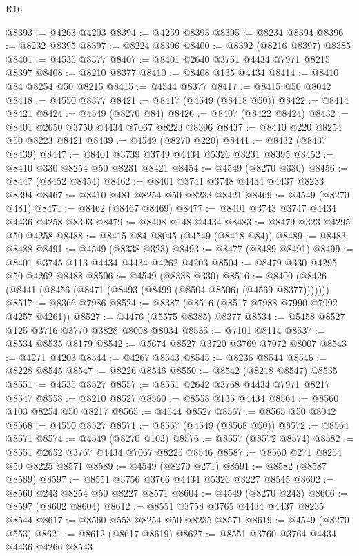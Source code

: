 \begin{lexlean}{R16}
\begin{coremodule}
@8393 := @4263 @4203
@8394 := @4259 @8393
@8395 := @8234 @8394
@8396 := @8232 @8395
@8397 := @8224 @8396
@8400 := @8392 (@8216 @8397) @8385
@8401 := @4535 @8377
@8407 := @8401 @2640 @3751 @4434 @7971 @8215 @8397
@8408 := @8210 @8377
@8410 := @8408 @135 @4434
@8414 := @8410 @84 @8254 @50 @8215
@8415 := @4544 @8377
@8417 := @8415 @50 @8042
@8418 := @4550 @8377
@8421 := @8417 (@4549 (@8418 @50))
@8422 := @8414 @8421
@8424 := @4549 (@8270 @84)
@8426 := @8407 (@8422 @8424)
@8432 := @8401 @2650 @3750 @4434 @7067 @8223 @8396
@8437 := @8410 @220 @8254 @50 @8223 @8421
@8439 := @4549 (@8270 @220)
@8441 := @8432 (@8437 @8439)
@8447 := @8401 @3739 @3749 @4434 @5326 @8231 @8395
@8452 := @8410 @330 @8254 @50 @8231 @8421
@8454 := @4549 (@8270 @330)
@8456 := @8447 (@8452 @8454)
@8462 := @8401 @3741 @3748 @4434 @4437 @8233 @8394
@8467 := @8410 @481 @8254 @50 @8233 @8421
@8469 := @4549 (@8270 @481)
@8471 := @8462 (@8467 @8469)
@8477 := @8401 @3743 @3747 @4434 @4436 @4258 @8393
@8479 := @8408 @148 @4434
@8483 := @8479 @323 @4295 @50 @4258
@8488 := @8415 @84 @8045 (@4549 (@8418 @84))
@8489 := @8483 @8488
@8491 := @4549 (@8338 @323)
@8493 := @8477 (@8489 @8491)
@8499 := @8401 @3745 @113 @4434 @4434 @4262 @4203
@8504 := @8479 @330 @4295 @50 @4262 @8488
@8506 := @4549 (@8338 @330)
@8516 := @8400 (@8426 (@8441 (@8456 (@8471 (@8493 (@8499 (@8504 @8506) (@4569 @8377)))))))
@8517 := @8366 @7986
@8524 := @8387 (@8516 (@8517 @7988 @7990 @7992 @4257 @4261))
@8527 := @4476 (@5575 @8385) @8377
@8534 := @5458 @8527 @125 @3716 @3770 @3828 @8008 @8034
@8535 := @7101 @8114
@8537 := @8534 @8535 @8179
@8542 := @5674 @8527 @3720 @3769 @7972 @8007
@8543 := @4271 @4203
@8544 := @4267 @8543
@8545 := @8236 @8544
@8546 := @8228 @8545
@8547 := @8226 @8546
@8550 := @8542 (@8218 @8547) @8535
@8551 := @4535 @8527
@8557 := @8551 @2642 @3768 @4434 @7971 @8217 @8547
@8558 := @8210 @8527
@8560 := @8558 @135 @4434
@8564 := @8560 @103 @8254 @50 @8217
@8565 := @4544 @8527
@8567 := @8565 @50 @8042
@8568 := @4550 @8527
@8571 := @8567 (@4549 (@8568 @50))
@8572 := @8564 @8571
@8574 := @4549 (@8270 @103)
@8576 := @8557 (@8572 @8574)
@8582 := @8551 @2652 @3767 @4434 @7067 @8225 @8546
@8587 := @8560 @271 @8254 @50 @8225 @8571
@8589 := @4549 (@8270 @271)
@8591 := @8582 (@8587 @8589)
@8597 := @8551 @3756 @3766 @4434 @5326 @8227 @8545
@8602 := @8560 @243 @8254 @50 @8227 @8571
@8604 := @4549 (@8270 @243)
@8606 := @8597 (@8602 @8604)
@8612 := @8551 @3758 @3765 @4434 @4437 @8235 @8544
@8617 := @8560 @553 @8254 @50 @8235 @8571
@8619 := @4549 (@8270 @553)
@8621 := @8612 (@8617 @8619)
@8627 := @8551 @3760 @3764 @4434 @4436 @4266 @8543

\end{coremodule}
\end{lexlean}
